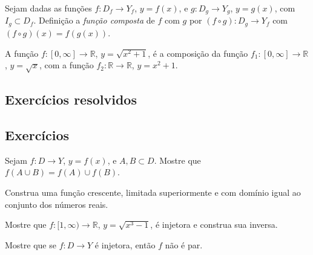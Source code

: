 \begin{defn}
  Sejam dadas as funções $f:D_f\to Y_f$, $y = f(x)$, e $g:D_g\to Y_g$, $y = g(x)$, com $I_g\subset D_f$. Definição a \emph{função composta} de $f$ com $g$ por $(f\circ g):D_g\to Y_f$ com $(f\circ g)(x) = f\left(g(x)\right)$.
\end{defn}

\begin{ex}
  A função $f:[0, \infty]\to\mathbb{R}$, $y=\sqrt{x^2 + 1}$, é a composição da função $f_1:[0, \infty]\to\mathbb{R}$, $y = \sqrt{x}$, com a função $f_2:\mathbb{R}\to\mathbb{R}$, $y = x^2+1$.
\end{ex}

\subsection*{Exercícios resolvidos}

\construirExeresol

\subsection*{Exercícios}

\construirExer

\begin{exer}
  Sejam $f:D\to Y$, $y=f(x)$, e $A, B \subset D$. Mostre que $f(A\cup B) = f(A)\cup f(B)$.
\end{exer}
\begin{resp}
  \construirResp
\end{resp}

\begin{exer}
  Construa uma função crescente, limitada superiormente e com domínio igual ao conjunto dos números reais.
\end{exer}
\begin{resp}
  \construirResp
\end{resp}

\begin{exer}
  Mostre que $f:[1, \infty)\to \mathbb{R}$, $y = \sqrt{x^3 - 1}$, é injetora e construa sua inversa.
\end{exer}
\begin{resp}
  \construirResp
\end{resp}

\begin{exer}
  Mostre que se $f:D\to Y$ é injetora, então $f$ não é par.
\end{exer}
\begin{resp}
  \construirResp
\end{resp}

